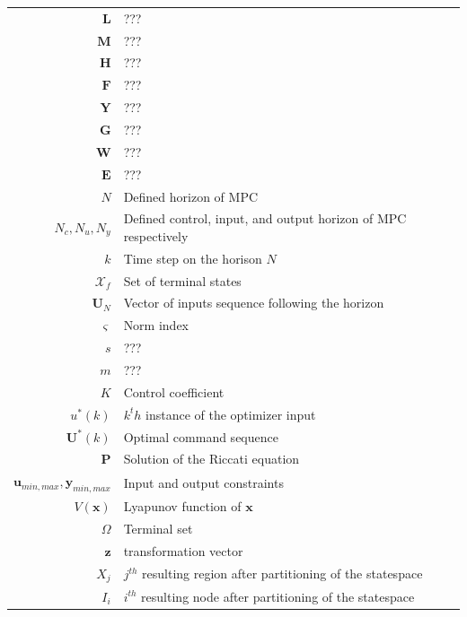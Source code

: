 \begin{longtable}{r l}
	$\textbf{L}$																&???\\
	$\textbf{M}$																&???\\
	$\textbf{H}$																&???\\
	$\textbf{F}$																&???\\
	$\textbf{Y}$																&???\\
	$\textbf{G}$																&???\\
	$\textbf{W}$																&???\\
	$\textbf{E}$																&???\\
	$N$											& Defined horizon of MPC\\
	$N_c,N_u,N_y$											& Defined control, input, and output horizon of MPC respectively\\
	$k$																& Time step on the horison $N$ \\
	$\mathcal{X}_f$															& Set of terminal states \\
	$\textbf{U}_N$										& Vector of inputs sequence following the horizon\\
	$\varsigma$											& Norm index\\
	$s$																& ???\\
	$m$																& ???\\
	$K$															& Control coefficient \\
	$u^*(k)$													& $k^th$ instance of the optimizer input\\
	$\textbf{U}^*(k)$									& Optimal command sequence\\
	$\textbf{P}$																& Solution of the Riccati equation\\
	$\textbf{u}_{min,max},\textbf{y}_{min,max}$					& Input and output constraints\\
	$V(\textbf{x})$														& Lyapunov function of $\textbf{x}$\\
	$\Omega$ 													& Terminal set\\
	$\textbf{z}$																& transformation vector\\
	$X_j$															& $j^{th}$ resulting region after partitioning of the statespace\\
	$I_i$															& $i^{th}$ resulting node after partitioning of the statespace\\
	
\hline
\end{longtable}

%

